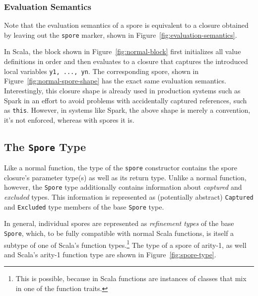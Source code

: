 \documentclass{llncs}
\begin{document}
\subsubsection{Evaluation Semantics}

Note that the evaluation semantics of a spore is equivalent to a closure
obtained by leaving out the \verb|spore| marker, shown in
Figure~\ref{fig:evaluation-semantics}.

In Scala, the block shown in Figure~\ref{fig:normal-block} first initializes
all value definitions in order and then evaluates to a closure that captures
the introduced local variables \verb|y1, ..., yn|. The corresponding spore,
shown in Figure~\ref{fig:normal-spore-shape} has the exact same evaluation
semantics. Interestingly, this closure shape is already used in production
systems such as Spark in an effort to avoid problems with accidentally
captured references, such as \verb|this|. However, in systems like Spark, the
above shape is merely a convention, it's not enforced, whereas with spores it
is.

\vspace{2mm}
\subsection{The \texttt{Spore} Type}
\label{sec:spore-type}
\vspace{1mm}

Like a normal function, the type of the \verb|spore| constructor contains the
spore closure's parameter type(s) as well as its return type. Unlike a normal function,
however, the \verb|Spore| type additionally contains information about
\textit{captured} and \textit{excluded} types. This information is represented
as (potentially abstract) \verb|Captured| and \verb|Excluded| type members of
the base \verb|Spore| type.

In general, individual spores are represented as {\em refinement types} of the
base \verb|Spore|, which, to be fully compatible with normal Scala functions,
is itself a subtype of one of Scala's function types.\footnote{This is possible, because in Scala functions are instances of classes that mix in one of the function traits.}
The type of a spore of arity-1, as well and Scala's arity-1 function type are
shown in Figure~\ref{fig:spore-type}.
\end{document}
